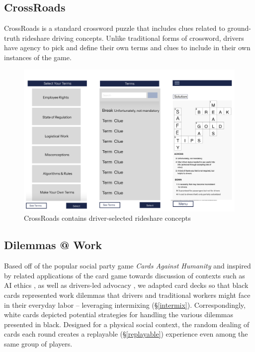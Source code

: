 \subsection{CrossRoads} 
CrossRoads is a standard crossword puzzle that includes clues related to ground-truth rideshare driving concepts. Unlike traditional forms of crossword, drivers have agency to pick and define their own terms and clues to include in their own instances of the game.

\FloatBarrier
\begin{figure}[h!]
    \centering
\includegraphics[width=.9\linewidth]{Chapters/figures/CrossRoads.png}
    \caption{CrossRoads contains driver-selected rideshare concepts}
    \label{crossroad}
\end{figure}
\FloatBarrier


\subsection{Dilemmas @ Work} 
Based off of the popular social party game \textit{Cards Against Humanity} and inspired by related applications of the card game towards discussion of contexts such as AI ethics \cite{license}, as well as drivers-led advocacy \cite{cards}, we adapted card decks so that black cards represented work dilemmas that drivers and traditional workers might face in their everyday labor -- leveraging intermixing (\S\ref{intermix}). Correspondingly, white cards depicted potential strategies for handling the various dilemmas presented in black. Designed for a physical social context, the random dealing of cards each round creates a replayable (\S\ref{replayable}) experience even among the same group of players.

